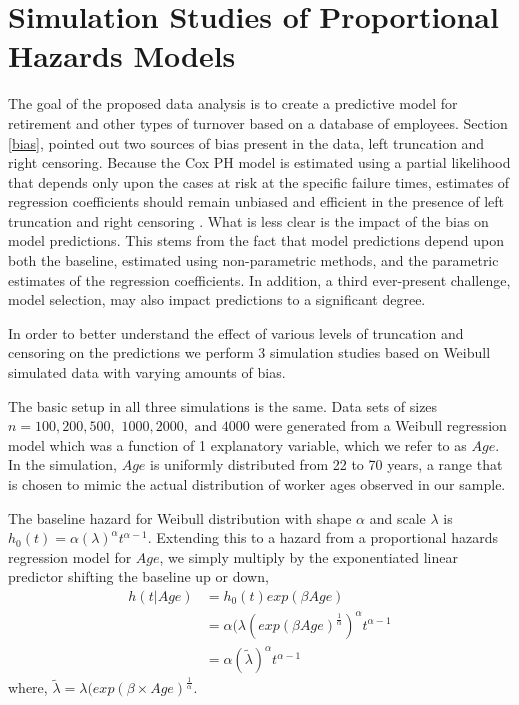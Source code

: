 \documentclass[12pt,letterpaper]{article}
\begin{document}
 \section{Simulation Studies of Proportional Hazards Models}

The goal of the proposed data analysis is to create a predictive model for retirement and other types of turnover based on a database of employees.  Section \ref{bias}, pointed out two sources of bias present in the data, left truncation and right censoring.  Because the Cox PH model is estimated using a partial likelihood that depends only upon the cases at risk at the specific failure times, estimates of regression coefficients should remain unbiased and efficient in the presence of left truncation and right censoring \citep{Harrell2002}.  What is less clear is the impact of the bias on model predictions. This stems from the fact that model predictions depend upon both the baseline, estimated using non-parametric methods, and the parametric estimates of the regression coefficients.  In addition, a third ever-present challenge, model selection, may also impact predictions to a significant degree.

In order to better understand the effect of various levels of truncation and censoring on the predictions we perform 3 simulation studies based on Weibull simulated data with varying amounts of bias.

The basic setup in all three simulations is the same. Data sets of sizes $n =100, 200, 500,$ $1000, 2000,$ $\text{and } 4000$ were generated from a Weibull regression model which was a function of 1 explanatory variable, which we refer to as $Age$.  In the simulation, $Age$ is uniformly distributed from 22 to 70 years, a range that is chosen to mimic the actual distribution of worker ages observed in our sample.

The baseline hazard for Weibull distribution with shape $\alpha$ and scale $\lambda$ is $h_0(t)=\alpha(\lambda)^\alpha t^{\alpha-1}$.  Extending this to a hazard from a proportional hazards regression model for $Age$, we simply multiply by the exponentiated linear predictor shifting the baseline up or down,
\begin{equation} \label{eq:weibull}
\begin{split}%
h(t|Age) & =h_0(t)exp(\beta Age) \\
&=\alpha (\lambda (exp(\beta Age)^{\frac{1}{\alpha}})^\alpha t^{\alpha-1} \\
&=\alpha(\tilde{\lambda} )^\alpha t^{\alpha-1}
\end{split}
\end{equation}
where, $\tilde{\lambda}=\lambda (exp(\beta \times Age)^{\frac{1}{\alpha}}$.
\end{document}
